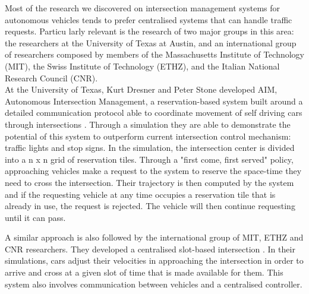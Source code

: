 Most of the research we discovered on intersection management systems for autonomous vehicles tends to prefer centralised systems that can handle traffic requests.
Particu	larly relevant is the research of two major groups in this area: the researchers at the University of Texas at Austin, and an international group of researchers composed by members of the Massachusetts Institute of Technology (MIT), the Swiss Institute of Technology (ETHZ), and the Italian National Research Council (CNR).\\

At the University of Texas, Kurt Dresner and Peter Stone developed AIM, Autonomous Intersection Management, a reservation-based system built around a detailed communication protocol able to coordinate movement of self driving cars through intersections \cite{texas}.
Through a simulation they are able to demonstrate the potential of this system to outperform current intersection control mechanism: traffic lights and stop signs.
In the simulation, the intersection center is divided into a n x n grid of reservation tiles.
Through a "first come, first served" policy, approaching vehicles make a request to the system to reserve the space-time they need to cross the intersection. 
Their trajectory is then computed by the system and if the requesting vehicle at any time occupies a reservation tile that is already in use, the request is rejected.
The vehicle will then continue requesting until it can pass.

A similar approach is also followed by the international group of MIT, ETHZ and CNR researchers.
They developed a centralised slot-based intersection \cite{mit}.
In their simulations, cars adjust their velocities in approaching the intersection in order to arrive and cross at a given slot of time that is made available for them.
This system also involves communication between vehicles and a centralised controller.